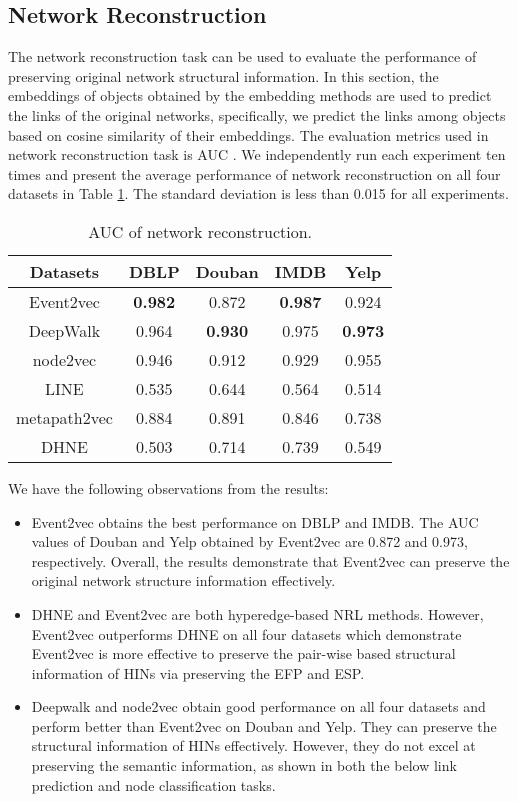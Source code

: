 \subsection{Network Reconstruction}
The network reconstruction task can be used to evaluate the performance of preserving original network structural information. In this section, the embeddings of objects obtained by the embedding methods are used to predict the links of the original networks, specifically, we predict the links among objects based on cosine similarity of their embeddings. The evaluation metrics used in network reconstruction task is AUC \cite{fawcett2006introduction}. We independently run each experiment ten times and present the average performance of network reconstruction on all four datasets in Table \ref{table2}.  The standard deviation is less than 0.015 for all experiments.

\begin{table}
	\centering
	\caption{{\small AUC of network reconstruction.}}\label{table2}
	\begin{tabular}{|c|c|c|c|c|}
		\toprule
		Datasets & DBLP & Douban & IMDB & Yelp \\
		\midrule
		Event2vec & \textbf{0.982} & 0.872 & \textbf{0.987} & 0.924 \\
		DeepWalk & 0.964 & \textbf{0.930} & 0.975 & \textbf{0.973} \\
		node2vec & 0.946 & 0.912 & 0.929 & 0.955 \\
		LINE & 0.535 & 0.644 & 0.564 & 0.514 \\
		metapath2vec & 0.884 & 0.891 & 0.846 & 0.738 \\
		DHNE & 0.503 & 0.714 & 0.739 & 0.549 \\
		\bottomrule
	\end{tabular}
\end{table}

We have the following observations from the results:
\begin{itemize}
	\item Event2vec obtains the best performance on DBLP and IMDB. The AUC values of Douban and Yelp obtained by Event2vec are 0.872 and 0.973, respectively. Overall, the results demonstrate that Event2vec can preserve the original network structure information effectively.
	\item DHNE and Event2vec are both hyperedge-based NRL methods. However, Event2vec outperforms DHNE on all four datasets which demonstrate Event2vec is more effective to preserve the pair-wise based structural information of HINs via preserving the EFP and ESP.
	\item Deepwalk and node2vec obtain good performance on all four datasets and perform better than Event2vec on Douban and Yelp. They can preserve the structural information of HINs effectively. However, they do not excel at preserving the semantic information, as shown in both the below link prediction and node classification tasks.
\end{itemize}

